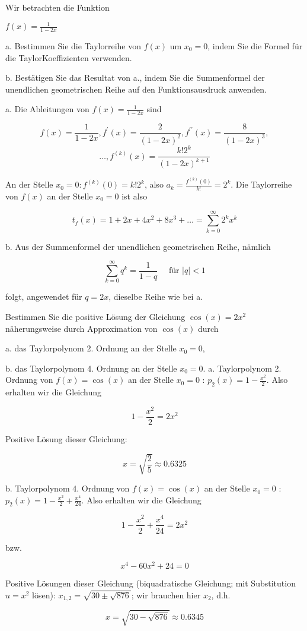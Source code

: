 \begin{example}
    Wir betrachten die Funktion

$
f(x)=\frac{1}{1-2 x}
$

a. Bestimmen Sie die Taylorreihe von $f(x)$ um $x_{0}=0$, indem Sie die Formel für die TaylorKoeffizienten verwenden.

b. Bestätigen Sie das Resultat von a., indem Sie die Summenformel der unendlichen geometrischen Reihe auf den Funktionsausdruck anwenden.
\tcblower

a. Die Ableitungen von $f(x)=\frac{1}{1-2 x}$ sind

$$
f(x)=\frac{1}{1-2 x}, f^{\prime}(x)=\frac{2}{(1-2 x)^{2}}, f^{\prime \prime}(x)=\frac{8}{(1-2 x)^{3}}, $$ $$\ldots, f^{(k)}(x)=\frac{k!2^{k}}{(1-2 x)^{k+1}}
$$

An der Stelle $x_{0}=0: f^{(k)}(0)=k!2^{k}$, also $a_{k}=\frac{f^{(k)}(0)}{k!}=2^{k}$. Die Taylorreihe von $f(x)$ an der Stelle $x_{0}=0$ ist also

$$
t_{f}(x)=1+2 x+4 x^{2}+8 x^{3}+\ldots=\sum_{k=0}^{\infty} 2^{k} x^{k}
$$

b. Aus der Summenformel der unendlichen geometrischen Reihe, nämlich

$$
\sum_{k=0}^{\infty} q^{k}=\frac{1}{1-q} \quad \text { für }|q|<1
$$

folgt, angewendet für $q=2 x$, dieselbe Reihe wie bei a.
\end{example}

\begin{example}
    Bestimmen Sie die positive Lösung der Gleichung $\cos (x)=2 x^{2}$ näherungsweise durch Approximation von $\cos (x)$ durch

a. das Taylorpolynom 2. Ordnung an der Stelle $x_{0}=0$,

b. das Taylorpolynom 4. Ordnung an der Stelle $x_{0}=0$.
\tcblower
a. Taylorpolynom 2. Ordnung von $f(x)=\cos (x)$ an der Stelle $x_{0}=0$ : $p_{2}(x)=1-\frac{x^{2}}{2}$. Also erhalten wir die Gleichung

$$
1-\frac{x^{2}}{2}=2 x^{2}
$$

Positive Lösung dieser Gleichung:

$$
x=\sqrt{\frac{2}{5}} \approx 0.6325
$$

b. Taylorpolynom 4. Ordnung von $f(x)=\cos (x)$ an der Stelle $x_{0}=0$ : $p_{2}(x)=1-\frac{x^{2}}{2}+\frac{x^{4}}{24}$. Also erhalten wir die Gleichung

$$
1-\frac{x^{2}}{2}+\frac{x^{4}}{24}=2 x^{2}
$$

bzw.

$$
x^{4}-60 x^{2}+24=0
$$

Positive Lösungen dieser Gleichung (biquadratische Gleichung; mit Substitution $u=x^{2}$ lösen): $x_{1,2}=\sqrt{30 \pm \sqrt{876}}$; wir brauchen hier $x_{2}$, d.h.

$$
x=\sqrt{30-\sqrt{876}} \approx 0.6345
$$
\end{example}

